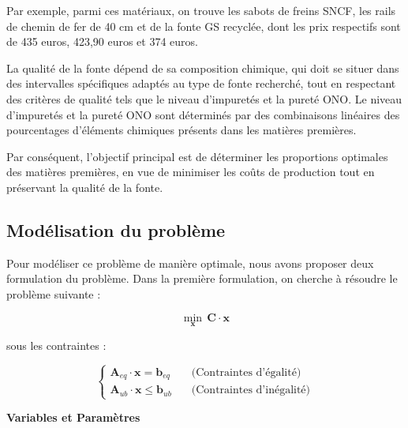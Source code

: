 \documentclass[12pt]{article}
\begin{document}
Par exemple, parmi ces matériaux, on trouve les sabots de freins SNCF, les 
rails de chemin de fer de 40 cm et de la fonte GS recyclée, dont les prix 
respectifs sont de 435 euros, 423,90 euros et 374 euros.

La qualité de la fonte dépend de sa composition chimique, qui doit se 
situer dans des intervalles spécifiques adaptés au type de fonte recherché,
tout en respectant des critères de qualité tels que le niveau d'impuretés 
et la pureté ONO. Le niveau d'impuretés et la pureté ONO sont déterminés 
par des combinaisons linéaires des pourcentages d'éléments chimiques 
présents dans les matières premières.

Par conséquent, l'objectif principal est de déterminer les proportions 
optimales des matières premières, en vue de minimiser les coûts de 
production tout en préservant la qualité de la fonte.






\subsection{ Modélisation du problème }

Pour modéliser ce problème de manière optimale, nous avons proposer 
deux formulation du problème. Dans la première formulation, 
on cherche à résoudre le problème suivante : 

\[
\underset{\mathbf{x}}{\min} \, \mathbf{C} \cdot \mathbf{x}
\]

sous les contraintes :

$$
\begin{cases}
\mathbf{A}_{eq} \cdot \mathbf{x} = \mathbf{b}_{eq} \quad &\text{(Contraintes d'égalité)} \\
\mathbf{A}_{ub} \cdot \mathbf{x} \leq \mathbf{b}_{ub} \quad &\text{(Contraintes d'inégalité)}
\end{cases}
$$

\textbf{Variables et Paramètres }
\end{document}
